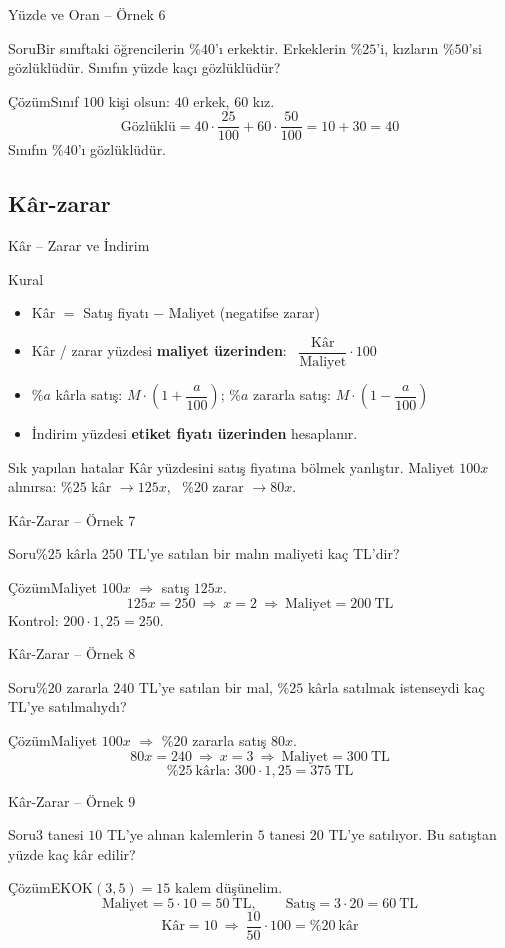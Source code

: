 \documentclass[aspectratio=169,11pt,handout]{beamer}
\newcommand{\soru}[3]{%
\begin{frame}{#1}
  \begin{block}{Soru}\large #2\end{block}
  \pause
  \begin{exampleblock}{Çözüm}\large #3\end{exampleblock}
\end{frame}}
\begin{document}
\soru{Yüzde ve Oran -- Örnek 6}
{Bir sınıftaki öğrencilerin \(\%40\)'ı erkektir. Erkeklerin \(\%25\)'i, kızların \(\%50\)'si gözlüklüdür. Sınıfın yüzde kaçı gözlüklüdür?}
{Sınıf \(100\) kişi olsun: \(40\) erkek, \(60\) kız.
\[\text{Gözlüklü}=40\cdot\frac{25}{100}+60\cdot\frac{50}{100}=10+30=40\]
Sınıfın \(\%40\)'ı gözlüklüdür.}

\subsection{Kâr-zarar}
\begin{frame}{Kâr -- Zarar ve İndirim}
\begin{block}{Kural}
\begin{itemize}
\item Kâr \(=\) Satış fiyatı \(-\) Maliyet \quad (negatifse zarar)
\item Kâr / zarar yüzdesi \textbf{maliyet üzerinden}: \ \(\dfrac{\text{Kâr}}{\text{Maliyet}}\cdot 100\)
\item \(\%a\) kârla satış: \(M\cdot\left(1+\dfrac{a}{100}\right)\); \quad \(\%a\) zararla satış: \(M\cdot\left(1-\dfrac{a}{100}\right)\)
\item İndirim yüzdesi \textbf{etiket fiyatı üzerinden} hesaplanır.
\end{itemize}
\end{block}
\begin{alertblock}{Sık yapılan hatalar}
Kâr yüzdesini satış fiyatına bölmek yanlıştır. Maliyet \(100x\) alınırsa: \(\%25\) kâr \(\to 125x\), \ \(\%20\) zarar \(\to 80x\).
\end{alertblock}
\end{frame}

\soru{Kâr-Zarar -- Örnek 7}
{\(\%25\) kârla \(250\) TL'ye satılan bir malın maliyeti kaç TL'dir?}
{Maliyet \(100x\) \(\Rightarrow\) satış \(125x\).
\[125x=250\ \Rightarrow\ x=2\ \Rightarrow\ \text{Maliyet}=200\ \text{TL}\]
Kontrol: \(200\cdot 1{,}25=250\).}

\soru{Kâr-Zarar -- Örnek 8}
{\(\%20\) zararla \(240\) TL'ye satılan bir mal, \(\%25\) kârla satılmak istenseydi kaç TL'ye satılmalıydı?}
{Maliyet \(100x\) \(\Rightarrow\) \(\%20\) zararla satış \(80x\).
\[80x=240\ \Rightarrow\ x=3\ \Rightarrow\ \text{Maliyet}=300\ \text{TL}\]
\[\%25\ \text{kârla: } 300\cdot 1{,}25=375\ \text{TL}\]}

\soru{Kâr-Zarar -- Örnek 9}
{\(3\) tanesi \(10\) TL'ye alınan kalemlerin \(5\) tanesi \(20\) TL'ye satılıyor. Bu satıştan yüzde kaç kâr edilir?}
{EKOK\((3,5)=15\) kalem düşünelim.
\[\text{Maliyet}=5\cdot 10=50\ \text{TL},\qquad \text{Satış}=3\cdot 20=60\ \text{TL}\]
\[\text{Kâr}=10\ \Rightarrow\ \frac{10}{50}\cdot 100=\%20\ \text{kâr}\]}
\end{document}
